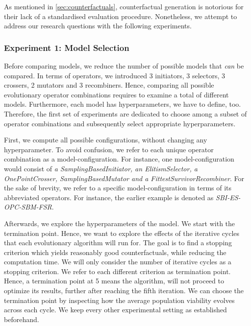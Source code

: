 \documentclass[./../../paper.tex]{subfiles}
\begin{document}
As mentioned in \autoref{sec:counterfactuals}, counterfactual generation is notorious for their lack of a standardised evaluation procedure. Nonetheless, we attempt to address our research questions with the following experiments.

\subsubsection{Experiment 1: Model Selection}
Before comparing models, we reduce the number of possible models that \emph{can} be compared. In terms of operators, we introduced 3 initiators, 3 selectors, 3 crossers, 2 mutators and 3 recombiners. Hence, comparing all possible evolutionary operator combinations requires to examine a total of \NumEvoCombinations different models. Furthermore, each model has hyperparameters, we have to define, too. Therefore, the first set of experiments are dedicated to choose among a subset of operator combinations and subsequently select appropriate hyperparameters. 

First, we compute all possible configurations, without changing any hyperparameter. To avoid confusion, we refer to each unique operator combination as a model-configuration. For instance, one model-configuration would consist of \emph{a SamplingBasedInitiator, an ElitismSelector, a OnePointCrosser, SamplingBasedMutator and a FittestSurvivorRecombiner}. For the sake of brevity, we refer to a specific model-configuration in terms of its abbreviated operators. For instance, the earlier example is denoted as \emph{SBI-ES-OPC-SBM-FSR}.

Afterwards, we explore the hyperparameters of the model. We start with the termination point. Hence, we want to explore the effects of the iterative cycles that each evolutionary algorithm will run for. The goal is to find a stopping criterion which yields reasonably good counterfactuals, while reducing the computation time. We will only consider the number of iterative cycles as a stopping criterion. We refer to each different criterion as termination point. Hence, a termination point at 5 means the algorithm, will not proceed to optimize its results, further after reaching the fifth iteration. We can choose the termination point by inspecting how the average population viability evolves across each cycle. We keep every other experimental setting as established beforehand.
\end{document}
